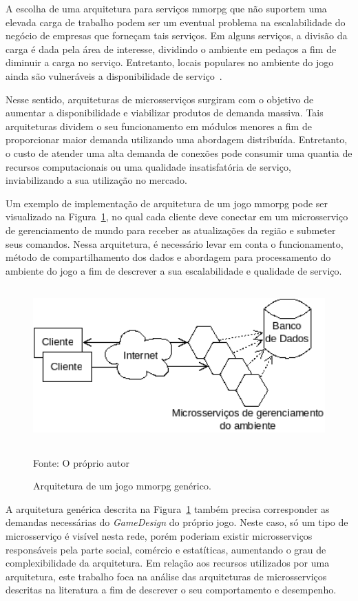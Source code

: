 A escolha de uma arquitetura para serviços \ac{mmorpg} que não suportem uma elevada carga de trabalho podem ser um eventual problema na escalabilidade do negócio de empresas que forneçam tais serviços.
%
Em alguns serviços, a divisão da carga é dada pela área de interesse, dividindo o ambiente em pedaços a fim de diminuir a carga no serviço.
%
Entretanto, locais populares no ambiente do jogo ainda são vulneráveis a disponibilidade de serviço~\cite{1417630}.



Nesse sentido, arquiteturas de microsserviços surgiram com o objetivo de aumentar a disponibilidade e viabilizar produtos de demanda massiva.
%
Tais arquiteturas dividem o seu funcionamento em módulos menores a fim de proporcionar maior demanda utilizando uma abordagem distribuída.
%
Entretanto, o custo de atender uma alta demanda de conexões pode consumir uma quantia de recursos computacionais ou uma qualidade insatisfatória de serviço, inviabilizando a sua utilização no mercado.



Um exemplo de implementação de arquitetura de um jogo \ac{mmorpg} pode ser visualizado na Figura~\ref{fig:generica}, no qual cada cliente deve conectar em um microsserviço de gerenciamento de mundo para receber as atualizações da região e submeter seus comandos.
%
Nessa arquitetura, é necessário levar em conta o funcionamento, método de compartilhamento dos dados e abordagem para processamento do ambiente do jogo a fim de descrever a sua escalabilidade e qualidade de serviço.


\begin{figure}[htb!]
\caption{Arquitetura de um jogo \ac{mmorpg} genérico.}
\label{fig:generica}
\includegraphics[height=6.0cm]{img/cap3/generica.png}
\centering

Fonte: O próprio autor
\end{figure}

A arquitetura genérica descrita na Figura~\ref{fig:generica} também precisa corresponder as demandas necessárias do \textit{GameDesign} do próprio jogo.
%
Neste caso, só um tipo de microsserviço é visível nesta rede, porém poderiam existir microsserviços responsáveis pela parte social, comércio e estatíticas, aumentando o grau de complexibilidade da arquitetura.
%
Em relação aos recursos utilizados por uma arquitetura, este trabalho foca na análise das arquiteturas de microsserviços descritas na literatura a fim de descrever o seu comportamento e desempenho.



